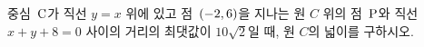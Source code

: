 중심~$\mathrm{C}$가 직선 $y=x$ 위에 있고 점~$(-2{,}\mkern3mu\mathopen{}6)$을 지나는 원 $C$ 위의 점~$\mathrm{P}$와 직선 $x+y+8=0$ 사이의 거리의 최댓값이 $10\sqrt{2}$일 때, 원 $C$의 넓이를 구하시오. 
